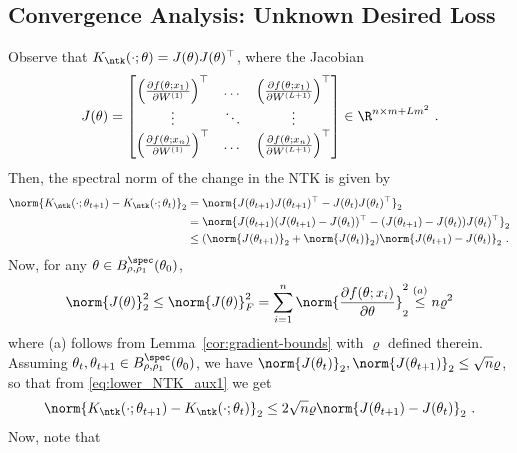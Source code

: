 \subsection{Convergence Analysis: Unknown Desired Loss} 

\lemmNTKstep*


\proof
Observe that $K_{\ntk}(\cdot;\theta)=J(\theta) J(\theta)^\top$, where the Jacobian
$$
J(\theta)=
\begin{bmatrix}
\left(\frac{\partial f(\theta;x_1)}{\partial W^{(1)}}\right)^\top&\dots& \left(\frac{\partial f(\theta;x_1)}{\partial W^{(L+1)}}\right)^\top\\
\vdots &\ddots&\vdots\\
\left(\frac{\partial f(\theta;x_n)}{\partial W^{(1)}}\right)^\top&\dots& \left(\frac{\partial f(\theta;x_n)}{\partial W^{(L+1)}}\right)^\top
\end{bmatrix}\in\R^{n\times m+Lm^2}~.
$$
Then, the spectral norm of the change in the NTK is given by
\begin{equation}
\label{eq:lower_NTK_aux1}
\begin{aligned}
\norm{K_{\ntk}(\cdot;\theta_{t+1})-K_{\ntk}(\cdot;\theta_t)}_2
    &=\norm{J(\theta_{t+1}) J(\theta_{t+1})^\top - J(\theta_t) J(\theta_t)^\top}_2\\
    &=\norm{J(\theta_{t+1}) (J(\theta_{t+1})-J(\theta_t))^\top - (J(\theta_{t+1}) - J(\theta_t)) J(\theta_t)^\top}_2\\
    &\leq (\norm{J(\theta_{t+1})}_2 + \norm{J(\theta_t)}_2) \norm{J(\theta_{t+1})-J(\theta_t)}_2~.
    \end{aligned}
\end{equation}
Now, for any $\theta\in B_{\rho,\rho_1}^{\spec}(\theta_0)$,
$$
\norm{J(\theta)}_2^2\leq \norm{J(\theta)}_F^2 = \sum^n_{i=1}\norm{\frac{\partial f(\theta;x_i)}{\partial \theta}}_2^2 \overset{(a)}{\leq} n \varrho^2
$$
where (a) follows from Lemma~\ref{cor:gradient-bounds} with $\varrho$ defined therein. Assuming $\theta_t, \theta_{t+1} \in B_{\rho,\rho_1}^{\spec}(\theta_0)$, we have $\norm{J(\theta_t)}_2, \norm{J(\theta_{t+1})}_2 \leq \sqrt{n} \varrho$, so that from \eqref{eq:lower_NTK_aux1} we get
\begin{equation}
\label{eq:lower_NTK_aux2}
\begin{aligned}
\norm{K_{\ntk}(\cdot;\theta_{t+1})-K_{\ntk}(\cdot;\theta_t)}_2 \leq 2\sqrt{n} \varrho \norm{J(\theta_{t+1})-J(\theta_t)}_2~.
    \end{aligned}
\end{equation}
Now, note that

